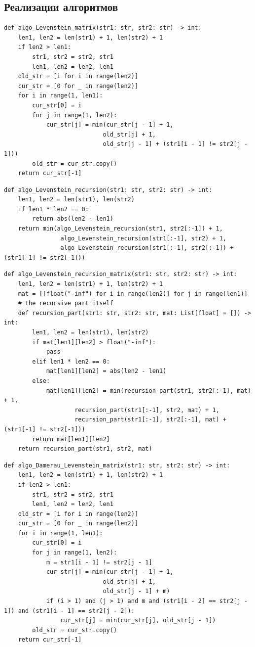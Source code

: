 \documentclass[a4paper,12pt]{article}
\begin{document}
\subsection{Реализации алгоритмов}
\begin{lstlisting}[caption=реализация матричного алгоритма Левенштейна]
def algo_Levenstein_matrix(str1: str, str2: str) -> int:
    len1, len2 = len(str1) + 1, len(str2) + 1
    if len2 > len1:
        str1, str2 = str2, str1
        len1, len2 = len2, len1
    old_str = [i for i in range(len2)]
    cur_str = [0 for _ in range(len2)]
    for i in range(1, len1):
        cur_str[0] = i
        for j in range(1, len2):
            cur_str[j] = min(cur_str[j - 1] + 1,
                            old_str[j] + 1,
                            old_str[j - 1] + (str1[i - 1] != str2[j - 1]))
        old_str = cur_str.copy()
    return cur_str[-1]
\end{lstlisting}
\begin{lstlisting}[caption=реализация рекурсивного алгоритма Левенштейна]
def algo_Levenstein_recursion(str1: str, str2: str) -> int:
    len1, len2 = len(str1), len(str2)
    if len1 * len2 == 0:
        return abs(len2 - len1)
    return min(algo_Levenstein_recursion(str1, str2[:-1]) + 1,
                algo_Levenstein_recursion(str1[:-1], str2) + 1,
                algo_Levenstein_recursion(str1[:-1], str2[:-1]) + (str1[-1] != str2[-1]))
\end{lstlisting}
\begin{lstlisting}[caption=реализация рекурсивно-матричного алгоритма Левенштейна]
def algo_Levenstein_recursion_matrix(str1: str, str2: str) -> int:
    len1, len2 = len(str1) + 1, len(str2) + 1
    mat = [[float("-inf") for i in range(len2)] for j in range(len1)]
    # the recursive part itself
    def recursion_part(str1: str, str2: str, mat: List[float] = []) -> int:
        len1, len2 = len(str1), len(str2)
        if mat[len1][len2] > float("-inf"):
            pass
        elif len1 * len2 == 0:
            mat[len1][len2] = abs(len2 - len1)
        else:
            mat[len1][len2] = min(recursion_part(str1, str2[:-1], mat) + 1,
                    recursion_part(str1[:-1], str2, mat) + 1,
                    recursion_part(str1[:-1], str2[:-1], mat) + (str1[-1] != str2[-1]))
        return mat[len1][len2]
    return recursion_part(str1, str2, mat)
\end{lstlisting}
\begin{lstlisting}[caption=реализация матричного алгоритма Дамерау-Левенштейна]
def algo_Damerau_Levenstein_matrix(str1: str, str2: str) -> int:
    len1, len2 = len(str1) + 1, len(str2) + 1
    if len2 > len1:
        str1, str2 = str2, str1
        len1, len2 = len2, len1
    old_str = [i for i in range(len2)]
    cur_str = [0 for _ in range(len2)]
    for i in range(1, len1):
        cur_str[0] = i
        for j in range(1, len2):
            m = str1[i - 1] != str2[j - 1]
            cur_str[j] = min(cur_str[j - 1] + 1,
                            old_str[j] + 1,
                            old_str[j - 1] + m)
            if (i > 1) and (j > 1) and m and (str1[i - 2] == str2[j - 1]) and (str1[i - 1] == str2[j - 2]):
                cur_str[j] = min(cur_str[j], old_str[j - 1])
        old_str = cur_str.copy()
    return cur_str[-1]
\end{lstlisting}
\end{document}
